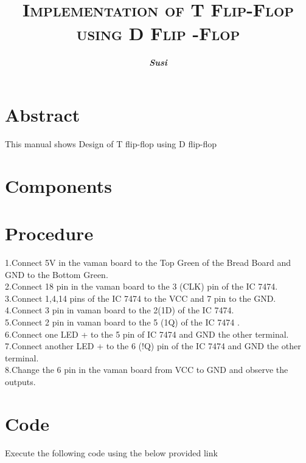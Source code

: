 \documentclass{article}
\title{\textbf{\textsc{Implementation of T Flip-Flop using D Flip -Flop}}}
\author{\textit{\textbf{Susi}}}
\begin{document}
\maketitle
\section{Abstract}
This manual shows Design of T flip-flop using D flip-flop
\section{Components}
\begin{table}[ht]
\caption{}
\label{Tabel-1}
\end{table}
\section{Procedure}
1.Connect 5V  in the vaman board to the Top Green of the Bread Board  and GND to the Bottom Green.
\\
2.Connect 18 pin in the vaman board to the 3 (CLK) pin of the IC 7474.
\\
3.Connect 1,4,14  pins of the IC 7474 to the VCC and 7 pin to the GND.
\\
4.Connect  3 pin in vaman board  to the  2(1D) of the IC 7474.
\\
5.Connect 2  pin in vaman board to the 5 (1Q) of the IC 7474 .
\\
6.Connect one LED + to the 5 pin of IC 7474 and GND the other terminal.
\\
7.Connect another LED +  to the 6 (!Q) pin of the IC 7474 and GND the other terminal.\\
8.Change the 6 pin in the vaman board from VCC to GND and observe the outputs.
\\

\section{Code}
Execute the following code using the below provided link
\\
\begin{table}[ht]
\end{table}
\end{document}
